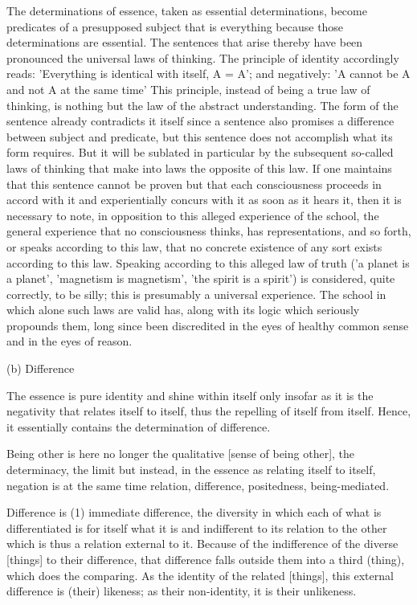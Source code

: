     The determinations of essence, taken as essential determinations,
    become predicates of a presupposed subject that is everything because
    those determinations are essential.
    The sentences that arise thereby have been pronounced
    the universal laws of thinking.
    The principle of identity accordingly reads:
    'Everything is identical with itself, A = A';
    and negatively:
    'A cannot be A and not A at the same time'
    This principle, instead of being a true law of thinking,
    is nothing but the law of the abstract understanding.
    The form of the sentence already contradicts it itself
    since a sentence also promises a difference between subject and predicate,
    but this sentence does not accomplish what its form requires.
    But it will be sublated in particular by the subsequent so-called
    laws of thinking that make into laws the opposite of this law.
    If one maintains that this sentence cannot be proven but that
    each consciousness proceeds in accord with it and
    experientially concurs with it as soon as it hears it,
    then it is necessary to note,
    in opposition to this alleged experience of the school,
    the general experience that no consciousness thinks,
    has representations, and so forth, or speaks according to this law,
    that no concrete existence of any sort exists according to this law.
    Speaking according to this alleged law of truth
    ('a planet is a planet', 'magnetism is magnetism', 'the spirit is a spirit')
    is considered, quite correctly, to be silly;
    this is presumably a universal experience.
    The school in which alone such laws are valid has,
    along with its logic which seriously propounds them,
    long since been discredited in the eyes of
    healthy common sense and in the eyes of reason.

(b) Difference

The essence is pure identity and shine within itself only insofar
as it is the negativity that relates itself to itself,
thus the repelling of itself from itself.
Hence, it essentially contains the determination of difference.

    Being other is here no longer the qualitative [sense of being other],
    the determinacy, the limit but instead, in the essence as
    relating itself to itself, negation is at the same time relation,
    difference, positedness, being-mediated.

Difference is (1) immediate difference,
the diversity in which each of what is differentiated is
for itself what it is and indifferent to its relation to the other
which is thus a relation external to it.
Because of the indifference of the diverse [things] to their difference,
that difference falls outside them into a third (thing), which does the comparing.
As the identity of the related [things],
this external difference is (their) likeness;
as their non-identity, it is their unlikeness.

